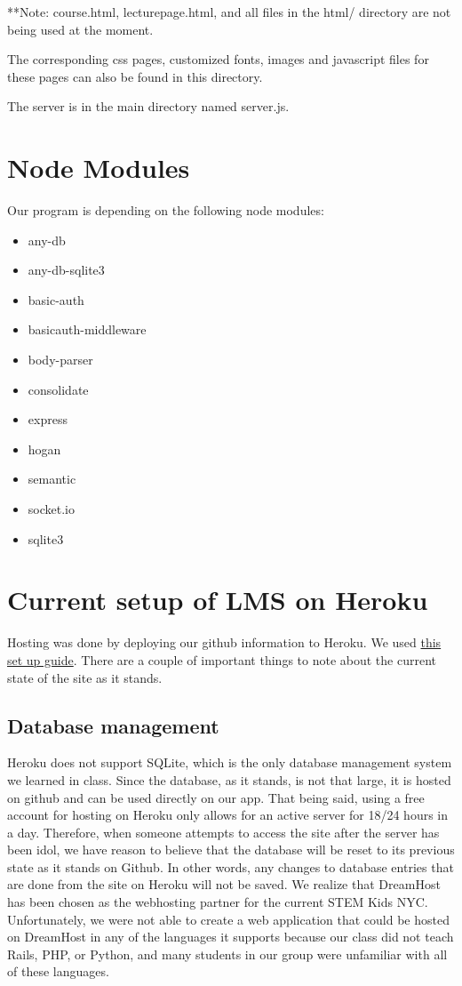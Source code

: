 \documentclass[12pt]{article}
\begin{document}
**Note: course.html, lecturepage.html, and all files in the html/ directory are not being used at the moment.

The corresponding css pages, customized fonts, images and javascript files for these pages can also be found in this directory.

The server is in the main directory named server.js.

\section{Node Modules}
Our program is depending on the following node modules:
\begin{itemize}
    \item any-db
    \item any-db-sqlite3
    \item basic-auth
    \item basicauth-middleware
    \item body-parser
    \item consolidate
    \item express
    \item hogan
    \item semantic
    \item socket.io
    \item sqlite3
\end{itemize}

\section{Current setup of LMS on Heroku}
Hosting was done by deploying our github information to Heroku. We used \href{https://devcenter.heroku.com/articles/getting-started-with-nodejs#introduction}{this set up guide}. There are a couple of important things to note about the current state of the site as it stands.
\subsection{Database management}
Heroku does not support SQLite, which is the only database management system we learned in class. Since the database, as it stands, is not that large, it is hosted on github and can be used directly on our app. That being said, using a free account for hosting on Heroku only allows for an active server for 18/24 hours in a day. Therefore, when someone attempts to access the site after the server has been idol, we have reason to believe that the database will be reset to its previous state as it stands on Github. In other words, any changes to database entries that are done from the site on Heroku will not be saved. We realize that DreamHost has been chosen as the webhosting partner for the current STEM Kids NYC. Unfortunately, we were not able to create a web application that could be hosted on DreamHost in any of the languages it supports because our class did not teach Rails, PHP, or Python, and many students in our group were unfamiliar with all of these languages. 
\end{document}
